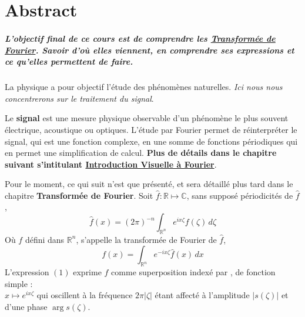 \documentclass[a4paper]{book}
\date{}
\newcommand\BackgroundPic{%
	\put(0,0){%
		\parbox[b][\paperheight]{\paperwidth}{%
			\vfill
			\centering
			\texttt{[image: background.png]}%
			\vfill
		}
	}
}
\begin{document}
\AddToShipoutPicture*{\BackgroundPic}
\maketitle
\clearpage

\tableofcontents


\chapter{Abstract}
\paragraph{L'objectif final de ce cours est de comprendre les \underline{Transformée de
Fourier}. Savoir d'où elles viennent, en comprendre ses expressions et ce
qu'elles permettent de faire.}

\newline
La physique a pour objectif l'étude des phénomènes naturelles. \emph{Ici nous nous
concentrerons sur le traitement du signal}.

Le \textbf{signal} est une mesure physique observable d'un phénomène le plus
souvent électrique, acoustique ou optiques. L'étude par Fourier permet de
réinterpréter le signal, qui est une fonction complexe, en une somme de
fonctions périodiques qui en permet une simplification de calcul. \textbf{Plus
de détails dans le chapitre suivant s'intitulant \underline{Introduction
Visuelle à Fourier}}.

\newline
\vspace{5mm}
Pour le moment, ce qui suit n'est que présenté, et sera détaillé plus tard dans
le chapitre \textbf{Transformée de Fourier}.
Soit $\hat{f} : \mathbb{R} \mapsto \mathbb{C}$, sans supposé périodicités de
$\hat{f}$,
\begin{equation}
	\hat{f}(x) = (2\pi)^{-n} \int_{\mathbb{R}^n} e^{ix\zeta}f(\zeta) \, d\zeta
\end{equation}
Où $f$ défini dans $\mathbb{R}^n$, s'appelle la transformée de Fourier de
$\hat{f}$,
\begin{equation}
	f(x) = \int_{\mathbb{R}^n} e^{-ix\zeta}\hat{f}(x) \, dx
\end{equation}
L'expression $(1)$ exprime $\hat{f}$ comme superposition indexé par \zeta, de
fonction simple : \\
$x \mapsto e^{ix\zeta}$ qui oscillent à la fréquence $2\pi|\zeta|$ étant affecté
à l'amplitude $|s(\zeta)|$ et d'une phase $\arg{s(\zeta)}$.
\end{document}
